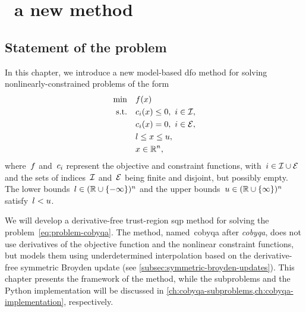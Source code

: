 %
%
%
\chapter{ \textemdash\ a new  method}
\label{ch:cobyqa-introduction}

\section{Statement of the problem}

In this chapter, we introduce a new model-based \gls{dfo} method for solving nonlinearly-constrained problems of the form
\begin{subequations}
    \label{eq:problem-cobyqa}
    \begin{align}
        \min        & \quad \obj(\iter) \label{eq:problem-cobyqa-obj}\\
        \text{s.t.} & \quad \con{i}(\iter) \le 0, ~ i \in \iub, \label{eq:problem-cobyqa-ub}\\
                    & \quad \con{i}(\iter) = 0, ~ i \in \ieq, \label{eq:problem-cobyqa-eq}\\
                    & \quad \xl \le x \le \xu, \label{eq:problem-cobyqa-bd}\\
                    & \quad \iter \in \R^n, \nonumber
    \end{align}
\end{subequations}
where~$f$ and~$c_{i}$ represent the objective and constraint functions, with~$i \in \mathcal{I} \cup \mathcal{E}$ and the sets of indices~$\mathcal{I}$ and~$\mathcal{E}$ being finite and disjoint, but possibly empty. 
The lower bounds~$l \in (\mathbb{R} \cup \{-\infty\})^n$ and the upper bounds~$u \in (\mathbb{R} \cup \{\infty\})^n$ satisfy~$l < u$.

We will develop a derivative-free trust-region \gls{sqp} method for solving the problem~\cref{eq:problem-cobyqa}.
The method, named~\gls{cobyqa} after \emph{\glsdesc{cobyqa}}, does not use derivatives of the objective function and the nonlinear constraint functions, but models them using underdetermined interpolation based on the derivative-free symmetric Broyden update (see \cref{subsec:symmetric-broyden-updates}).
This chapter presents the framework of the method, while the subproblems and the Python implementation will be discussed in \cref{ch:cobyqa-subproblems,ch:cobyqa-implementation}, respectively.


